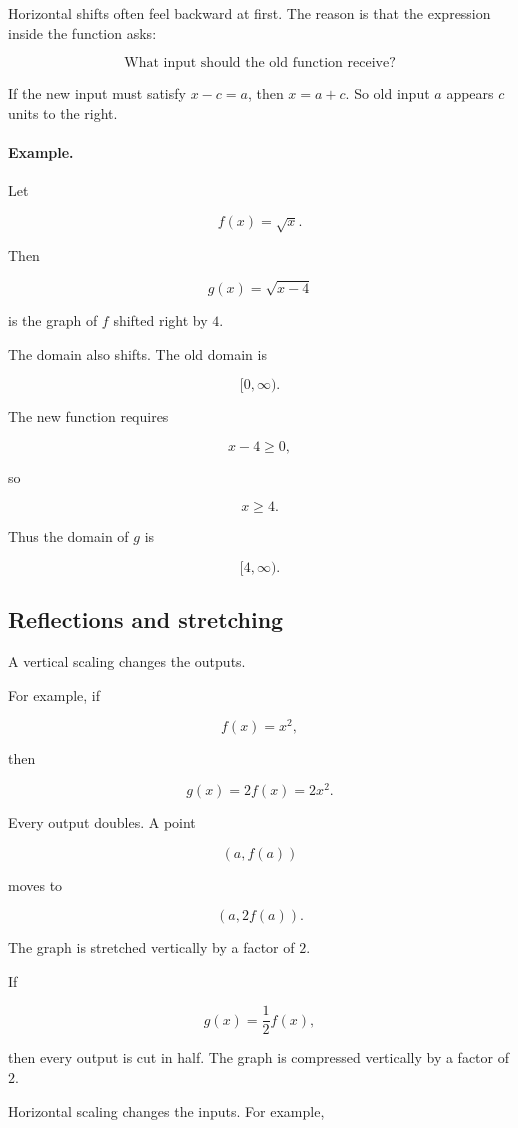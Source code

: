Horizontal shifts often feel backward at first. The reason is that the expression inside the function asks:

\[
\text{What input should the old function receive?}
\]

If the new input must satisfy \(x-c=a\), then \(x=a+c\). So old input \(a\) appears \(c\) units to the right.

\paragraph{Example.}
Let

\[
f(x)=\sqrt{x}.
\]

Then

\[
g(x)=\sqrt{x-4}
\]

is the graph of \(f\) shifted right by \(4\).

The domain also shifts. The old domain is

\[
[0,\infty).
\]

The new function requires

\[
x-4\ge 0,
\]

so

\[
x\ge 4.
\]

Thus the domain of \(g\) is

\[
[4,\infty).
\]

\subsection{Reflections and stretching}
\label{subsec:reflections-and-stretching}

A vertical scaling changes the outputs.

For example, if

\[
f(x)=x^2,
\]

then

\[
g(x)=2f(x)=2x^2.
\]

Every output doubles. A point

\[
(a,f(a))
\]

moves to

\[
(a,2f(a)).
\]

The graph is stretched vertically by a factor of \(2\).

If

\[
g(x)=\frac12 f(x),
\]

then every output is cut in half. The graph is compressed vertically by a factor of \(2\).

Horizontal scaling changes the inputs. For example,

